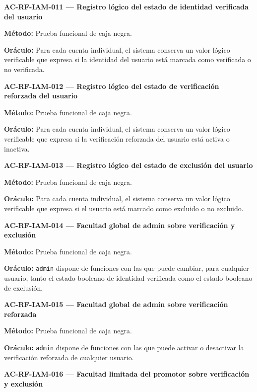 \documentclass[10pt,letterpaper]{article}
\begin{document}
\noindent\textbf{AC-RF-IAM-011 --- Registro lógico del estado de identidad verificada del usuario}\par
\textbf{Método:} Prueba funcional de caja negra.\par
\textbf{Oráculo:} Para cada cuenta individual, el sistema conserva un valor lógico verificable que expresa si la identidad del usuario está marcada como verificada o no verificada.\par\vspace{0.45em}
\noindent\textbf{AC-RF-IAM-012 --- Registro lógico del estado de verificación reforzada del usuario}\par
\textbf{Método:} Prueba funcional de caja negra.\par
\textbf{Oráculo:} Para cada cuenta individual, el sistema conserva un valor lógico verificable que expresa si la verificación reforzada del usuario está activa o inactiva.\par\vspace{0.45em}
\noindent\textbf{AC-RF-IAM-013 --- Registro lógico del estado de exclusión del usuario}\par
\textbf{Método:} Prueba funcional de caja negra.\par
\textbf{Oráculo:} Para cada cuenta individual, el sistema conserva un valor lógico verificable que expresa si el usuario está marcado como excluido o no excluido.\par\vspace{0.45em}
\noindent\textbf{AC-RF-IAM-014 --- Facultad global de admin sobre verificación y exclusión}\par
\textbf{Método:} Prueba funcional de caja negra.\par
\textbf{Oráculo:} \texttt{admin} dispone de funciones con las que puede cambiar, para cualquier usuario, tanto el estado booleano de identidad verificada como el estado booleano de exclusión.\par\vspace{0.45em}
\noindent\textbf{AC-RF-IAM-015 --- Facultad global de admin sobre verificación reforzada}\par
\textbf{Método:} Prueba funcional de caja negra.\par
\textbf{Oráculo:} \texttt{admin} dispone de funciones con las que puede activar o desactivar la verificación reforzada de cualquier usuario.\par\vspace{0.45em}
\noindent\textbf{AC-RF-IAM-016 --- Facultad limitada del promotor sobre verificación y exclusión}\par
\end{document}
